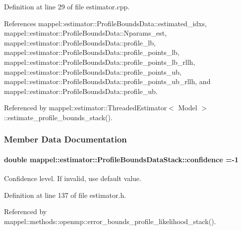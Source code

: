 Definition at line 29 of file estimator.\+cpp.



References mappel\+::estimator\+::\+Profile\+Bounds\+Data\+::estimated\+\_\+idxs, mappel\+::estimator\+::\+Profile\+Bounds\+Data\+::\+Nparams\+\_\+est, mappel\+::estimator\+::\+Profile\+Bounds\+Data\+::profile\+\_\+lb, mappel\+::estimator\+::\+Profile\+Bounds\+Data\+::profile\+\_\+points\+\_\+lb, mappel\+::estimator\+::\+Profile\+Bounds\+Data\+::profile\+\_\+points\+\_\+lb\+\_\+rllh, mappel\+::estimator\+::\+Profile\+Bounds\+Data\+::profile\+\_\+points\+\_\+ub, mappel\+::estimator\+::\+Profile\+Bounds\+Data\+::profile\+\_\+points\+\_\+ub\+\_\+rllh, and mappel\+::estimator\+::\+Profile\+Bounds\+Data\+::profile\+\_\+ub.



Referenced by mappel\+::estimator\+::\+Threaded\+Estimator$<$ Model $>$\+::estimate\+\_\+profile\+\_\+bounds\+\_\+stack().



\subsubsection{Member Data Documentation}
\paragraph[{\texorpdfstring{confidence}{confidence}}]{\setlength{\rightskip}{0pt plus 5cm}double mappel\+::estimator\+::\+Profile\+Bounds\+Data\+Stack\+::confidence =-\/1}\hypertarget{structmappel_1_1estimator_1_1ProfileBoundsDataStack_ac6e9709cd01fe1814dcaeaff4445c0a9}{}\label{structmappel_1_1estimator_1_1ProfileBoundsDataStack_ac6e9709cd01fe1814dcaeaff4445c0a9}


Confidence level. If invalid, use default value. 



Definition at line 137 of file estimator.\+h.



Referenced by mappel\+::methods\+::openmp\+::error\+\_\+bounds\+\_\+profile\+\_\+likelihood\+\_\+stack().

